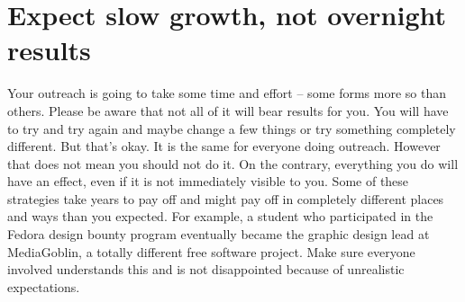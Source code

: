 \section{Expect slow growth, not overnight results}
Your outreach is going to take some time and effort -- some forms more so than others. Please be aware that not all of it will bear results for you. You will have to try and try again and maybe change a few things or try something completely different. But that’s okay. It is the same for everyone doing outreach. However that does not mean you should not do it. On the contrary, everything you do will have an effect, even if it is not immediately visible to you. Some of these strategies take years to pay off and might pay off in completely different places and ways than you expected. For example, a student who participated in the Fedora design bounty program eventually became the graphic design lead at MediaGoblin, a totally different free software project. Make sure everyone involved understands this and is not disappointed because of unrealistic expectations.
